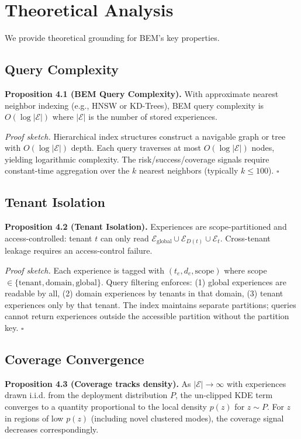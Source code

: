 \documentclass[twoside,11pt]{article}
\newcommand{\qed}{\hfill\ensuremath{\square}}
\begin{document}
\section{Theoretical Analysis}
\label{sec:theory}

We provide theoretical grounding for BEM's key properties.

\subsection{Query Complexity}

\textbf{Proposition 4.1 (BEM Query Complexity).} With approximate nearest neighbor indexing (e.g., HNSW or KD-Trees), BEM query complexity is $O(\log |\mathcal{E}|)$ where $|\mathcal{E}|$ is the number of stored experiences.

\textit{Proof sketch.} Hierarchical index structures construct a navigable graph or tree with $O(\log |\mathcal{E}|)$ depth. Each query traverses at most $O(\log |\mathcal{E}|)$ nodes, yielding logarithmic complexity. The risk/success/coverage signals require constant-time aggregation over the $k$ nearest neighbors (typically $k \leq 100$). \qed

\subsection{Tenant Isolation}

\textbf{Proposition 4.2 (Tenant Isolation).} Experiences are scope-partitioned and access-controlled: tenant $t$ can only read $\mathcal{E}_{\text{global}} \cup \mathcal{E}_{D(t)} \cup \mathcal{E}_t$. Cross-tenant leakage requires an access-control failure.

\textit{Proof sketch.} Each experience is tagged with $(t_e, d_e, \text{scope})$ where scope $\in \{\text{tenant}, \text{domain}, \text{global}\}$. Query filtering enforces: (1) global experiences are readable by all, (2) domain experiences by tenants in that domain, (3) tenant experiences only by that tenant. The index maintains separate partitions; queries cannot return experiences outside the accessible partition without the partition key. \qed

\subsection{Coverage Convergence}

\textbf{Proposition 4.3 (Coverage tracks density).} As $|\mathcal{E}| \to \infty$ with experiences drawn i.i.d. from the deployment distribution $P$, the un-clipped KDE term converges to a quantity proportional to the local density $p(z)$ for $z \sim P$. For $z$ in regions of low $p(z)$ (including novel clustered modes), the coverage signal decreases correspondingly.
\end{document}
